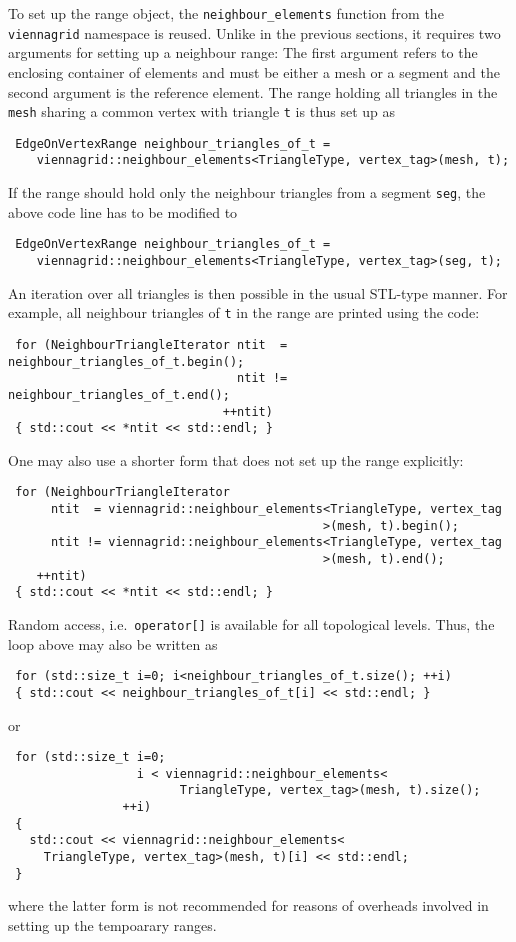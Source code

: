 To set up the range object, the \lstinline|neighbour_elements| function from the \lstinline|viennagrid| namespace is reused. Unlike in the previous sections, it requires two arguments
for setting up a neighbour range: The first argument refers to the enclosing container of elements and must be either a mesh or a segment and the second argument is the reference element.
The range holding all triangles in the \lstinline|mesh| sharing a common vertex with triangle \lstinline|t| is thus set up as
\begin{lstlisting}
 EdgeOnVertexRange neighbour_triangles_of_t =
    viennagrid::neighbour_elements<TriangleType, vertex_tag>(mesh, t);
\end{lstlisting}
If the range should hold only the neighbour triangles from a segment \lstinline|seg|, the above code line has to be modified to
\begin{lstlisting}
 EdgeOnVertexRange neighbour_triangles_of_t =
    viennagrid::neighbour_elements<TriangleType, vertex_tag>(seg, t);
\end{lstlisting}
An iteration over all triangles is then possible in the usual STL-type manner. For example, all neighbour triangles of \lstinline|t| in the range are printed using the code:
\begin{lstlisting}
 for (NeighbourTriangleIterator ntit  = neighbour_triangles_of_t.begin();
                                ntit != neighbour_triangles_of_t.end();
                              ++ntit)
 { std::cout << *ntit << std::endl; }
\end{lstlisting}


One may also use a shorter form that does not set up the range explicitly:
\begin{lstlisting}
 for (NeighbourTriangleIterator 
      ntit  = viennagrid::neighbour_elements<TriangleType, vertex_tag
                                            >(mesh, t).begin();
      ntit != viennagrid::neighbour_elements<TriangleType, vertex_tag
                                            >(mesh, t).end();
    ++ntit)
 { std::cout << *ntit << std::endl; }
\end{lstlisting}

Random access, i.e.~\lstinline|operator[]| is available for all topological levels. Thus, the loop above may also be written as
\begin{lstlisting}
 for (std::size_t i=0; i<neighbour_triangles_of_t.size(); ++i)
 { std::cout << neighbour_triangles_of_t[i] << std::endl; }
\end{lstlisting}
or
\begin{lstlisting}
 for (std::size_t i=0;
                  i < viennagrid::neighbour_elements<
                        TriangleType, vertex_tag>(mesh, t).size();
                ++i)
 {
   std::cout << viennagrid::neighbour_elements<
     TriangleType, vertex_tag>(mesh, t)[i] << std::endl;
 }
\end{lstlisting}
where the latter form is not recommended for reasons of overheads involved in setting up the tempoarary ranges.
